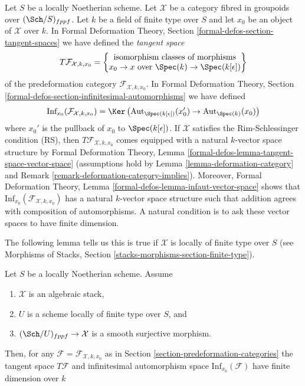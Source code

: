 \noindent
Let $S$ be a locally Noetherian scheme. Let $\mathcal{X}$ be a category
fibred in groupoids over $(\Sch/S)_{fppf}$. Let $k$ be a field of finite
type over $S$ and let $x_0$ be an object of $\mathcal{X}$ over $k$.
In Formal Deformation Theory, Section \ref{formal-defos-section-tangent-spaces}
we have defined the {\it tangent space}
\begin{equation}
\label{equation-tangent-space}
T\mathcal{F}_{\mathcal{X}, k, x_0} =
\left\{
\begin{matrix}
\text{isomorphism classes of morphisms}\\
x_0 \to x\text{ over }\Spec(k) \to \Spec(k[\epsilon])
\end{matrix}
\right\}
\end{equation}
of the predeformation category $\mathcal{F}_{\mathcal{X}, k, x_0}$.
In Formal Deformation Theory, Section
\ref{formal-defos-section-infinitesimal-automorphisms}
we have defined
\begin{equation}
\label{equation-infinitesimal-automorphisms}
\text{Inf}_{x_0}(\mathcal{F}_{\mathcal{X}, k, x_0}) =
\Ker\left(
\text{Aut}_{\Spec(k[\epsilon])}(x'_0) \to \text{Aut}_{\Spec(k)}(x_0)
\right)
\end{equation}
where $x_0'$ is the pullback of $x_0$ to $\Spec(k[\epsilon])$.
If $\mathcal{X}$ satisfies the Rim-Schlessinger condition (RS), then
$T\mathcal{F}_{\mathcal{X}, k, x_0}$ comes equipped with a natural
$k$-vector space structure by Formal Deformation Theory, Lemma
\ref{formal-defos-lemma-tangent-space-vector-space}
(assumptions hold by Lemma \ref{lemma-deformation-category} and
Remark \ref{remark-deformation-category-implies}). Moreover,
Formal Deformation Theory, Lemma \ref{formal-defos-lemma-infaut-vector-space}
shows that $\text{Inf}_{x_0}(\mathcal{F}_{\mathcal{X}, k, x_0})$ has a
natural $k$-vector space structure such that addition agrees with
composition of automorphisms. A natural condition
is to ask these vector spaces to have finite dimension.

\medskip\noindent
The following lemma tells us this is true if
$\mathcal{X}$ is locally of finite type over $S$ (see
Morphisms of Stacks, Section \ref{stacks-morphisms-section-finite-type}).

\begin{lemma}
\label{lemma-finite-dimension}
Let $S$ be a locally Noetherian scheme. Assume
\begin{enumerate}
\item $\mathcal{X}$ is an algebraic stack,
\item $U$ is a scheme locally of finite type over $S$, and
\item $(\Sch/U)_{fppf} \to \mathcal{X}$ is a smooth surjective
morphism.
\end{enumerate}
Then, for any $\mathcal{F} = \mathcal{F}_{\mathcal{X}, k, x_0}$ as in
Section \ref{section-predeformation-categories}
the tangent space $T\mathcal{F}$ and infinitesimal automorphism space
$\text{Inf}_{x_0}(\mathcal{F})$ have finite dimension over $k$
\end{lemma}


